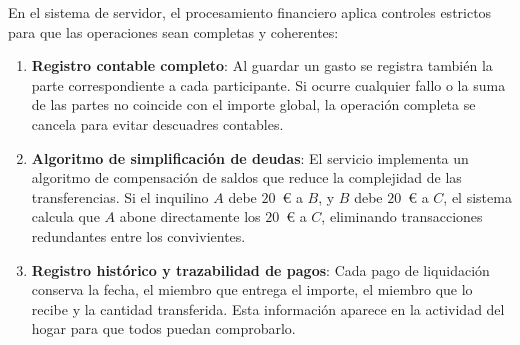 En el sistema de servidor, el procesamiento financiero aplica controles estrictos para que las operaciones sean completas y coherentes:

\begin{enumerate}
    \item \textbf{Registro contable completo}: Al guardar un gasto se registra también la parte correspondiente a cada participante. Si ocurre cualquier fallo o la suma de las partes no coincide con el importe global, la operación completa se cancela para evitar descuadres contables.
    \item \textbf{Algoritmo de simplificación de deudas}: El servicio implementa un algoritmo de compensación de saldos que reduce la complejidad de las transferencias. Si el inquilino $A$ debe $20$~€ a $B$, y $B$ debe $20$~€ a $C$, el sistema calcula que $A$ abone directamente los $20$~€ a $C$, eliminando transacciones redundantes entre los convivientes.
    \item \textbf{Registro histórico y trazabilidad de pagos}: Cada pago de liquidación conserva la fecha, el miembro que entrega el importe, el miembro que lo recibe y la cantidad transferida. Esta información aparece en la actividad del hogar para que todos puedan comprobarlo.
\end{enumerate}

